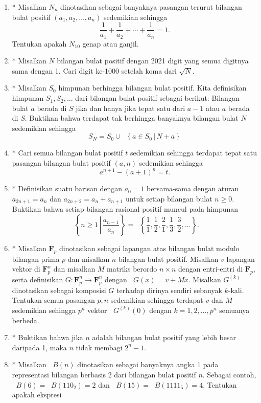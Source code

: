 \documentclass[12pt]{article}
\newcommand*\lrbr[1]{\mathop{}\!\left\lbrace#1\right\rbrace}
\newcommand*\func[2]{\mathop{}\!{#1}{\left({#2}\right)}}
\newcommand*\set[2]{\mathop{}\!\left\lbrace{{#1} \, \left| \, {#2} \right.}\right\rbrace}
\begin{document}
\begin{enumerate}[leftmargin=*]
		\item* Misalkan $ N_{n} $ dinotasikan sebagai banyaknya pasangan terurut bilangan bulat positif $ \left(a_{1}, a_{2}, \dots, a_{n}\right) $ sedemikian sehingga
		\[ \frac{1}{a_{1}} + \frac{1}{a_{2}} + \cdots + \frac{1}{a_{n}} = 1. \]
		Tentukan apakah $ N_{10} $ genap atau ganjil.
		\item* Misalkan $ N $ bilangan bulat positif dengan 2021 digit yang semua digitnya sama dengan 1. Cari digit ke-1000 setelah koma dari $ \sqrt{N} $.
		\item* Misalkan $ S_{0} $ himpunan berhingga bilangan bulat positif. Kita definisikan himpunan $ S_{1}, S_{2}, \dots $ dari bilangan bulat positif sebagai berikut: Bilangan bulat $ a $ berada di $ S $ jika dan hanya jika tepat satu dari $ a - 1 $ atau $ a $ berada di $ S $. Buktikan bahwa terdapat tak berhingga banyaknya bilangan bulat $ N $ sedemikian sehingga
		\[ S_{N} = S_{0} \cup \set{a \in S_{0}}{N + a} \]
		\item* Cari semua bilangan bulat positif $ t $ sedemikian sehingga terdapat tepat satu pasangan bilangan bulat positif $ \left(a, n\right) $ sedemikian sehingga
		\[ a^{n + 1} - \left(a + 1\right)^{n} = t. \]
		\item* Definisikan suatu barisan dengan $ a_{0} = 1 $ bersama-sama dengan aturan $ a_{2n + 1} = a_{n} $ dan $ a_{2n + 2} = a_{n} + a_{n + 1} $ untuk setiap bilangan bulat $ n \geq 0 $. Buktikan bahwa setiap bilangan rasional positif muncul pada himpunan
		\[ \set{n \geq 1}{\frac{a_{n - 1}}{a_{n}}} = \lrbr{\frac{1}{1}, \frac{1}{2}, \frac{2}{1}, \frac{1}{3}, \frac{3}{2}, \dots}. \]
		\item* Misalkan $ \mathbf{F}_{p} $ dinotasikan sebagai lapangan atas bilangan bulat modulo bilangan prima $ p $ dan misalkan $ n $ bilangan bulat positif. Misalkan $ v $ lapangan vektor di $ \mathbf{F}_{p}^{n} $ dan misalkan $ M $ matriks berordo $ n \times n $ dengan entri-entri di $ \mathbf{F}_{p} $, serta definisikan $ G : \mathbf{F}_{p}^{n} \to \mathbf{F}_{p}^{n} $ dengan $ \func{G}{x} = v + Mx $. Misalkan $ G^{\left(k\right)} $ dinotasikan sebagai komposisi $ G $ terhadap dirinya sendiri sebanyak $ k $-kali. Tentukan semua pasangan $ p, n $ sedemikian sehingga terdapat $ v $ dan $ M $ sedemikian sehingga $ p^{n} $ vektor $ \func{G^{\left(k\right)}}{0} $ dengan $ k = 1, 2, \dots, p^{n} $ semuanya berbeda.
		\item* Buktikan bahwa jika $ n $ adalah bilangan bulat positif yang lebih besar daripada 1, maka $ n $ tidak membagi $ 2^{n} - 1 $.
		\item* Misalkan $ \func{B}{n} $ dinotasikan sebagai banyaknya angka 1 pada representasi bilangan berbasis 2 dari bilangan bulat positif $ n $. Sebagai contoh, $ \func{B}{6} = \func{B}{110_{2}} = 2 $ dan $ \func{B}{15} = \func{B}{1111_{5}} = 4 $. Tentukan apakah ekspresi

\end{enumerate}
\end{document}
